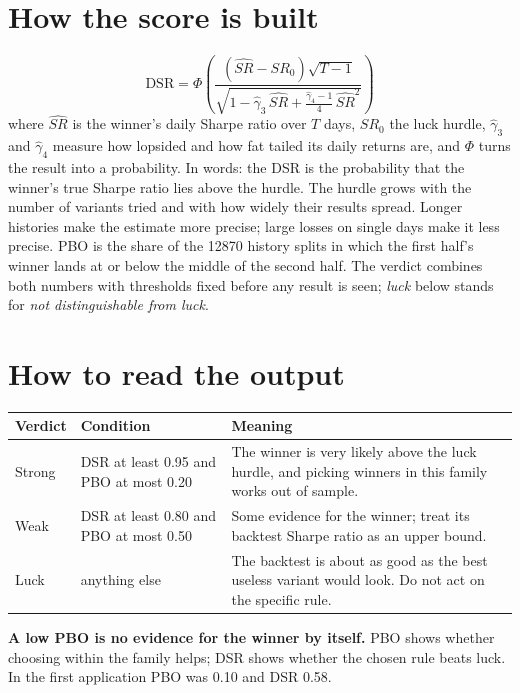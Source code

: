 \documentclass[10pt,a4paper]{article}
\begin{document}
\section{How the score is built}
\begin{equation*}
\text{DSR}=\Phi\!\left(\frac{(\widehat{SR}-SR_0)\sqrt{T-1}}{\sqrt{1-\hat\gamma_3\,\widehat{SR}+\frac{\hat\gamma_4-1}{4}\,\widehat{SR}^{2}}}\right)
\end{equation*}
where $\widehat{SR}$ is the winner's daily Sharpe ratio over $T$ days, $SR_0$ the luck hurdle, $\hat\gamma_3$ and $\hat\gamma_4$ measure how lopsided and how fat tailed its daily returns are, and $\Phi$ turns the result into a probability.
In words: the DSR is the probability that the winner's true Sharpe ratio lies above the hurdle.
The hurdle grows with the number of variants tried and with how widely their results spread.
Longer histories make the estimate more precise; large losses on single days make it less precise.
PBO is the share of the \num{12870} history splits in which the first half's winner lands at or below the middle of the second half.
The verdict combines both numbers with thresholds fixed before any result is seen; \emph{luck} below stands for \emph{not distinguishable from luck}.

\section{How to read the output}
\begin{tabularx}{\linewidth}{@{}P{2.4cm}P{3.6cm}L@{}}
\toprule
Verdict & Condition & Meaning \\
\midrule
Strong & DSR at least 0.95 and PBO at most 0.20 & The winner is very likely above the luck hurdle, and picking winners in this family works out of sample. \\
Weak & DSR at least 0.80 and PBO at most 0.50 & Some evidence for the winner; treat its backtest Sharpe ratio as an upper bound. \\
Luck & anything else & The backtest is about as good as the best useless variant would look. Do not act on the specific rule. \\
\bottomrule
\end{tabularx}

\textbf{A low PBO is no evidence for the winner by itself.}
PBO shows whether choosing within the family helps; DSR shows whether the chosen rule beats luck.
In the first application PBO was 0.10 and DSR 0.58.
\end{document}
